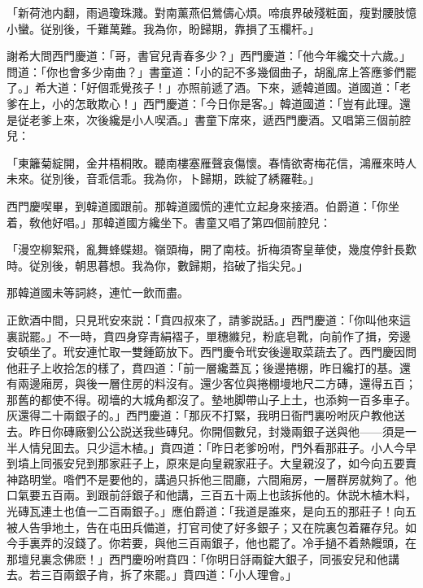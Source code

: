 「新荷池内翻，雨過瓊珠濺。對南薰燕侣鶯儔心煩。啼痕界破殘粧面，瘦對腰肢憶小蠻。従别後，千難萬難。我為你，盼歸期，靠損了玉欄杆。」

謝希大問西門慶道：「哥，書官兒青春多少？」西門慶道：「他今年纔交十六歲。」問道：「你也會多少南曲？」書童道：「小的記不多幾個曲子，胡亂席上答應爹們罷了。」希大道：「好個乖覺孩子！」亦照前遞了酒。下來，遞韓道國。道國道：「老爹在上，小的怎敢欺心！」西門慶道：「今日你是客。」韓道國道：「豈有此理。還是従老爹上來，次後纔是小人喫酒。」書童下席來，遞西門慶酒。又唱第三個前腔兒：

「東籬菊綻開，金井梧桐敗。聽南樓塞雁聲哀傷懷。春情欲寄梅花信，鴻雁來時人未來。従別後，音乖信乖。我為你，卜歸期，跌綻了綉羅鞋。」

西門慶喫畢，到韓道國跟前。那韓道國慌的連忙立起身來接酒。伯爵道：「你坐着，敎他好唱。」那韓道國方纔坐下。書童又唱了第四個前腔兒：

「漫空柳絮飛，亂舞蜂蝶翅。嶺頭梅，開了南枝。折梅須寄皇華使，幾度停針長歎時。従別後，朝思暮想。我為你，數歸期，掐破了指尖兒。」

那韓道國未等詞終，連忙一飲而盡。

正飲酒中間，只見玳安來説：「賁四叔來了，請爹説話。」西門慶道：「你叫他來這裏説罷。」不一時，賁四身穿青絹褶子，單穗縧兒，粉底皂靴，向前作了揖，旁邊安頓坐了。玳安連忙取一雙鍾筯放下。西門慶令玳安後邊取菜蔬去了。西門慶因問他莊子上收拾怎的樣了，賁四道：「前一層纔蓋瓦；後邊捲棚，昨日纔打的基。還有兩邊廂房，與後一層住房的料沒有。還少客位與捲棚墁地尺二方磚，還得五百；那舊的都使不得。砌墻的大城角都沒了。墊地脚帶山子上土，也添夠一百多車子。灰還得二十兩銀子的。」西門慶道：「那灰不打緊，我明日衙門裏吩咐灰户教他送去。昨日你磚廠劉公公説送我些磚兒。你開個數兒，封幾兩銀子送與他——須是一半人情兒囬去。只少這木植。」賁四道：「昨日老爹吩咐，門外看那莊子。小人今早到墳上同張安兒到那家莊子上，原來是向皇親家莊子。大皇親沒了，如今向五要賣神路明堂。喒們不是要他的，講過只拆他三間廳，六間廂房，一層群房就夠了。他口氣要五百兩。到跟前㧱銀子和他講，三百五十兩上也該拆他的。休説木植木料，光磚瓦連土也值一二百兩銀子。」應伯爵道：「我道是誰來，是向五的那莊子！向五被人告爭地土，告在屯田兵備道，打官司使了好多銀子；又在院裏包着羅存兒。如今手裏弄的沒錢了。你若要，與他三百兩銀子，他也罷了。冷手撾不着熱饅頭，在那壇兒裏念佛麽！」西門慶吩咐賁四：「你明日㧱兩錠大銀子，同張安兒和他講去。若三百兩銀子肯，拆了來罷。」賁四道：「小人理會。」

